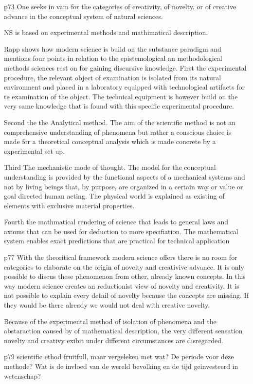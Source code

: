 p73
One seeks in vain for the categories of creativity, of novelty, or of creative advance in the conceptual system of natural sciences.

NS is based on experimental methods and mathimatical description.

Rapp shows how modern science is build on the substance paradigm and mentions four points in relation to the epistemological an methodological methods sciences rest on for gaining discursive knowledge.
First the experimental procedure, the relevant object of examination is isolated from its natural environment and placed in a laboratory equipped with technological artifacts for te examination of the object. The technical equipment is however build on the very same knowledge that is found with this specific experimental procedure.

Second the the Analytical method. The aim of the scientific method is not an comprehensive understanding of phenomena but rather a conscious choice is made for a theoretical conceptual analysis which is made concrete by a experimental set up.

Third The mechanistic mode of thought. The model for the conceptual understanding is provided by the functional aspects of a mechanical systems and not by living beings that, by purpose, are organized in a certain way or value or goal directed human acting. The physical world is explained as existing of elements with exclusive material properties.

Fourth the mathmatical rendering of science that leads to general laws and axioms that can be used for deduction to more specifiation. The mathematical system enables exact predictions that are practical for technical application

p77
With the theoritical framework modern science offers there is no room for categories to elaborate on the origin of novelty and creativive advance. It is only possible to discus these phenomenon from other, already known concepts.
In this way modern science creates an reductionist view of novelty and creativity. It is not possible to explain every detail of novelty because the concepts are missing. If they would be there already we would not deal with creative novelty.

Because of the experimental method of isolation of phenomena and the abstaraction caused by of mathematical description, the very different sensation novelty and creativy exibit under different circumstances are disregarded.

p79 scientific ethod fruitfull, maar vergeleken met wat? De periode voor deze methode? Wat is de invloed van de wereld bevolking en de tijd geinvesteerd in wetenschap?

